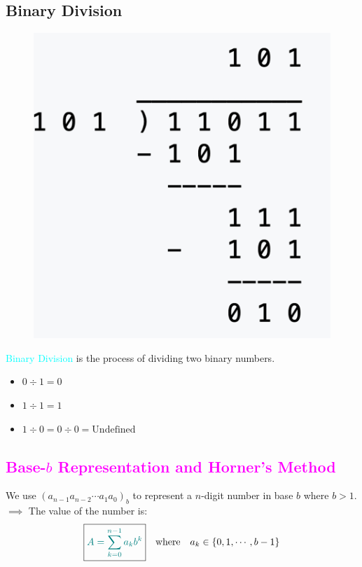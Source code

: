 \documentclass{book}
\begin{document}
\subsection{Binary Division}
\raggedright
\begin{figure}
    \includegraphics[scale=0.12]{ch1/ch1_figure1.jpeg}
\end{figure}
\textcolor{cyan}{Binary Division} is the process of dividing two binary numbers.\\
\begin{itemize}
    \item \(0 \div 1 = 0\)
    \item \(1 \div 1 = 1\)
    \item \(1 \div 0 = 0 \div 0 = \text{Undefined}\)
\end{itemize}
\newpage
\textcolor{magenta}{\section{\textbf{Base-$b$ Representation and Horner's Method}}}
We use $(a_{n-1}a_{n-2}\cdots a_1a_0)_b$ to represent a $n$-digit number in base $b$ where $b > 1$.\\
$\implies$ The value of the number is:
\[
\boxed{\textcolor{teal}{A = \sum_{k=0}^{n-1} a_k b^k}} \quad \text{where} \quad a_k \in \{0, 1, \cdots, b-1\}
\]
\end{document}
